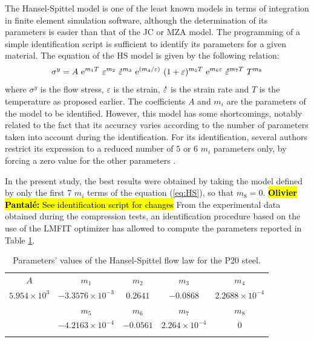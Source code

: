 \documentclass[twoside,english,1p,final,sort&compress]{elsarticle}
\theoremstyle{plain}
\newcommand{\e}[1]{{\rm e}^{#1}}
\newcommand{\mdot}[1]{\accentset{\mbox{\bfseries .}}{#1}}
\DeclareRobustCommand{\OP}[1]{ {\begingroup\sethlcolor{VWyellow}\textcolor{red}{\hl{\textbf{Olivier Pantal\'e:} #1}}\endgroup} }
\begin{document}
The Hansel-Spittel model \cite{Hensel-1978} is one of the least known models in terms of integration in finite element simulation software, although the determination of its parameters is easier than that of the JC or MZA model.
The programming of a simple identification script is sufficient to identify its parameters for a given material.
The equation of the HS model is given by the following relation:
\begin{equation}
\sigma^y = A~\e{m_1T}~\varepsilon^{m_2}~\mdot\varepsilon^{m_3}~\e{({m_4}/{\varepsilon})}~(1+\varepsilon)^{m_5T}~\e{m_6\varepsilon}~\mdot\varepsilon^{m_7T}~T^{m_8} \label{eq:HS}
\end{equation}
where $\sigma^y$ is the flow stress, $\varepsilon$ is the strain, $\mdot\varepsilon$ is the strain rate and $T$ is the temperature as proposed earlier.
The coefficients $A$ and $m_i$ are the parameters of the model to be identified.
However, this model has some shortcomings, notably related to the fact that its accuracy varies according to the number of parameters taken into account during the identification.
For its identification, several authors restrict its expression to a reduced number of $5$ or $6$ $m_i$ parameters only, by forcing a zero value for the other parameters \cite{Chadha-2018, Rudnytskyj-2020, Mehtedi-2015}.

In the present study, the best results were obtained by taking the model defined by only the first $7$ $m_i$ terms of the equation (\ref{eq:HS}), so that $m_8=0$.\OP{See identification script for changes}
From the experimental data obtained during the compression tests, an identification procedure based on the use of the LMFIT optimizer \cite{Newville-2016} has allowed to compute the parameters reported in Table \ref{tab:HSparameters}.

\begin{table}[h!]
\centering
\caption{Parameters' values of the Hansel-Spittel flow law for the P20 steel.}
\begin{tabular}{ccccc}
\hline
$A$ & $m_1$ & $m_2$ & $m_3$ & $m_4$\\
$5.954\times 10^{3}$ & $-3.3576\times10^{-3}$ & $0.2641$ & $-0.0868$ & $2.2688\times10^{-4}$\\\hline
& $m_5$ & $m_6$ & $m_7$ & $m_8$\\
& $-4.2163\times10^{-4}$ & $-0.0561$ & $2.264\times10^{-4}$ & $0$\\\hline
\label{tab:HSparameters}
\end{tabular}
\end{table}
\end{document}
